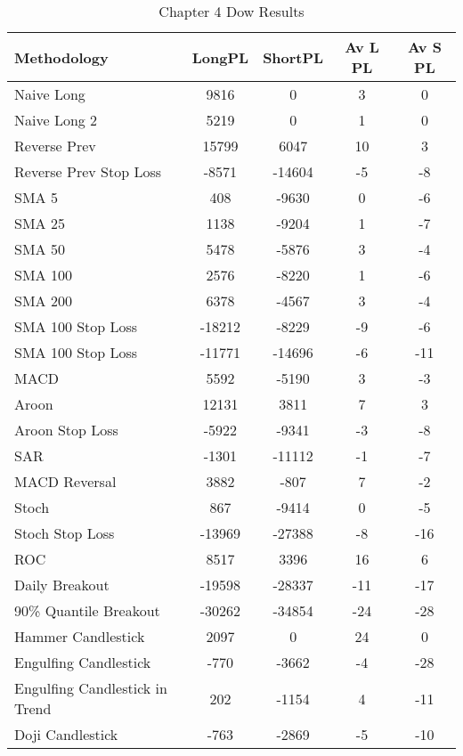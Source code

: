 \begin{table}[ht]
\centering
\caption[Chapter 4 Dow Results]{Chapter 4 Dow Results} 
\label{tab:chp6:dow_summary}
\begin{tabular}{lcccc}
  \toprule Methodology & LongPL & ShortPL & Av L PL & Av S PL \\ 
  \midrule Naive Long & 9816 & 0 & 3 & 0 \\ 
  Naive Long 2 & 5219 & 0 & 1 & 0 \\ 
  Reverse Prev & 15799 & 6047 & 10 & 3 \\ 
  Reverse Prev Stop Loss & -8571 & -14604 & -5 & -8 \\ 
  SMA 5 & 408 & -9630 & 0 & -6 \\ 
  SMA 25 & 1138 & -9204 & 1 & -7 \\ 
  SMA 50 & 5478 & -5876 & 3 & -4 \\ 
  SMA 100 & 2576 & -8220 & 1 & -6 \\ 
  SMA 200 & 6378 & -4567 & 3 & -4 \\ 
  SMA 100 Stop Loss & -18212 & -8229 & -9 & -6 \\ 
  SMA 100 Stop Loss & -11771 & -14696 & -6 & -11 \\ 
  MACD & 5592 & -5190 & 3 & -3 \\ 
  Aroon & 12131 & 3811 & 7 & 3 \\ 
  Aroon Stop Loss & -5922 & -9341 & -3 & -8 \\ 
  SAR & -1301 & -11112 & -1 & -7 \\ 
  MACD Reversal & 3882 & -807 & 7 & -2 \\ 
  Stoch & 867 & -9414 & 0 & -5 \\ 
  Stoch Stop Loss & -13969 & -27388 & -8 & -16 \\ 
  ROC & 8517 & 3396 & 16 & 6 \\ 
  Daily Breakout & -19598 & -28337 & -11 & -17 \\ 
  90\% Quantile Breakout & -30262 & -34854 & -24 & -28 \\ 
  Hammer Candlestick & 2097 & 0 & 24 & 0 \\ 
  Engulfing Candlestick & -770 & -3662 & -4 & -28 \\ 
  Engulfing Candlestick in Trend & 202 & -1154 & 4 & -11 \\ 
  Doji Candlestick & -763 & -2869 & -5 & -10 \\ 
   \bottomrule \end{tabular}
\end{table}
